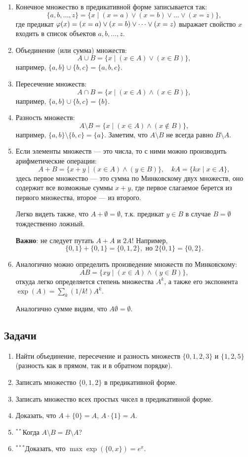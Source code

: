 \begin{enumerate}
\item Конечное множество в предикативной форме записывается так:
$$
\{a,b,\dots,z\} = \{x\mid (x=a)\lor(x=b)\lor\dots\lor(x=z)\},
$$
где предикат $\varphi(x)=(x=a)\lor(x=b)\lor\dots\lor(x=z)$ выражает свойство $x$ входить в список объектов $a,b,\dots,z$.
\item Объединение (или сумма) множеств:
$$
A\cup B = \{x\mid (x\in A)\lor(x\in B)\},
$$
например, $\{a,b\}\cup\{b,c\}=\{a,b,c\}$.
\item Пересечение множеств:
$$
A\cap B = \{x\mid (x\in A)\land(x\in B)\},
$$
например, $\{a,b\}\cup\{b,c\}=\{b\}$.
\item Разность множеств:
$$
A\setminus B = \{x\mid (x\in A)\land(x\notin B)\},
$$
например, $\{a,b\}\setminus\{b,c\}=\{a\}$. Заметим, что $A\setminus B$ не всегда равно $B\setminus A$.
\item Если элементы множеств --- это числа, то с ними можно производить арифметические операции:
$$
A+B = \{x+y\mid (x\in A)\land(y\in B)\}, \quad kA = \{kx\mid x\in A\},
$$
здесь первое множество --- это сумма по Минковскому двух множеств, оно содержит все возможные суммы $x+y$, где первое слагаемое берется из первого множества, второе --- из второго.

Легко видеть также, что $A+\emptyset=\emptyset$, т.к. предикат $y\in B$ в случае $B=\emptyset$ тождественно ложный.

\textbf{Важно}: не следует путать $A+A$ и $2A$! Например,
$$
\{0,1\}+\{0,1\}=\{0,1,2\},\mbox{ но }2\{0,1\}=\{0,2\}.
$$

\item Аналогично можно определить произведение множеств по Минковскому:
$$
AB = \{xy\mid (x\in A)\land(y\in B)\},
$$
откуда легко определяется степень множества $A^k$, а также его экспонента $\exp(A)=\sum_k(1/k!)A^k$.

Аналогично сумме видим, что $A\emptyset=\emptyset$.
\end{enumerate}

\subsection{Задачи}
\begin{enumerate}
\item Найти объединение, пересечение и разность множеств $\{0,1,2,3\}$ и $\{1,2,5\}$ (разность как в прямом, так и в обратном порядке).
\item Записать множество $\{0,1,2\}$ в предикативной форме.
\item Записать множество всех простых чисел в предикативной форме.
\item Доказать, что $A+\{0\}=A$, $A\cdot\{1\}=A$.
\item ${}^{**}$Когда $A\setminus B=B\setminus A$?
\item ${}^{***}$Доказать, что $\max\exp(\{0,x\}) = e^x$.
\end{enumerate}


